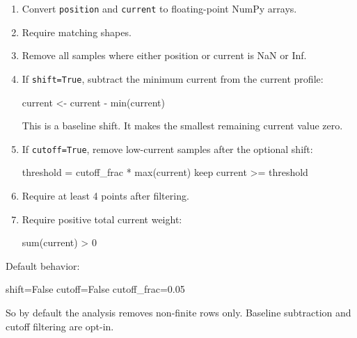 \documentclass[
]{article}
\newenvironment{Shaded}{}{}
\newcommand{\NormalTok}[1]{#1}
\begin{document}
\begin{enumerate}
\def\labelenumi{\arabic{enumi}.}
\item
  Convert \texttt{position} and \texttt{current} to floating-point NumPy
  arrays.
\item
  Require matching shapes.
\item
  Remove all samples where either position or current is NaN or Inf.
\item
  If \texttt{shift=True}, subtract the minimum current from the current
  profile:

\begin{Shaded}
\begin{Highlighting}[]
\NormalTok{current \textless{}{-} current {-} min(current)}
\end{Highlighting}
\end{Shaded}

  This is a baseline shift. It makes the smallest remaining current
  value zero.
\item
  If \texttt{cutoff=True}, remove low-current samples after the optional
  shift:

\begin{Shaded}
\begin{Highlighting}[]
\NormalTok{threshold = cutoff\_frac * max(current)}
\NormalTok{keep current \textgreater{}= threshold}
\end{Highlighting}
\end{Shaded}
\item
  Require at least 4 points after filtering.
\item
  Require positive total current weight:

\begin{Shaded}
\begin{Highlighting}[]
\NormalTok{sum(current) \textgreater{} 0}
\end{Highlighting}
\end{Shaded}
\end{enumerate}

Default behavior:

\begin{Shaded}
\begin{Highlighting}[]
\NormalTok{shift=False}
\NormalTok{cutoff=False}
\NormalTok{cutoff\_frac=0.05}
\end{Highlighting}
\end{Shaded}

So by default the analysis removes non-finite rows only. Baseline
subtraction and cutoff filtering are opt-in.
\end{document}
